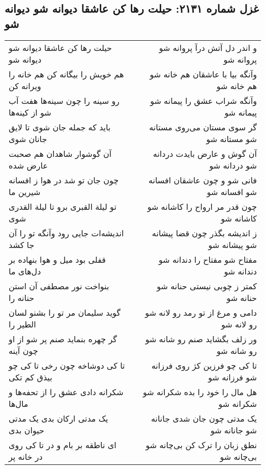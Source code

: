 \begin{center}
\section*{غزل شماره ۲۱۳۱: حیلت رها کن عاشقا دیوانه شو دیوانه شو}
\label{sec:2131}
\begin{longtable}{l p{0.5cm} r}
حیلت رها کن عاشقا دیوانه شو دیوانه شو
&&
و اندر دل آتش درآ پروانه شو پروانه شو
\\
هم خویش را بیگانه کن هم خانه را ویرانه کن
&&
وآنگه بیا با عاشقان هم خانه شو هم خانه شو
\\
رو سینه را چون سینه‌ها هفت آب شو از کینه‌ها
&&
وآنگه شراب عشق را پیمانه شو پیمانه شو
\\
باید که جمله جان شوی تا لایق جانان شوی
&&
گر سوی مستان می‌روی مستانه شو مستانه شو
\\
آن گوشوار شاهدان هم صحبت عارض شده
&&
آن گوش و عارض بایدت دردانه شو دردانه شو
\\
چون جان تو شد در هوا ز افسانه شیرین ما
&&
فانی شو و چون عاشقان افسانه شو افسانه شو
\\
تو لیلة القبری برو تا لیلة القدری شوی
&&
چون قدر مر ارواح را کاشانه شو کاشانه شو
\\
اندیشه‌ات جایی رود وآنگه تو را آن جا کشد
&&
ز اندیشه بگذر چون قضا پیشانه شو پیشانه شو
\\
قفلی بود میل و هوا بنهاده بر دل‌های ما
&&
مفتاح شو مفتاح را دندانه شو دندانه شو
\\
بنواخت نور مصطفی آن استن حنانه را
&&
کمتر ز چوبی نیستی حنانه شو حنانه شو
\\
گوید سلیمان مر تو را بشنو لسان الطیر را
&&
دامی و مرغ از تو رمد رو لانه شو رو لانه شو
\\
گر چهره بنماید صنم پر شو از او چون آینه
&&
ور زلف بگشاید صنم رو شانه شو رو شانه شو
\\
تا کی دوشاخه چون رخی تا کی چو بیذق کم تکی
&&
تا کی چو فرزین کژ روی فرزانه شو فرزانه شو
\\
شکرانه دادی عشق را از تحفه‌ها و مال‌ها
&&
هل مال را خود را بده شکرانه شو شکرانه شو
\\
یک مدتی ارکان بدی یک مدتی حیوان بدی
&&
یک مدتی چون جان شدی جانانه شو جانانه شو
\\
ای ناطقه بر بام و در تا کی روی در خانه پر
&&
نطق زبان را ترک کن بی‌چانه شو بی‌چانه شو
\\
\end{longtable}
\end{center}

